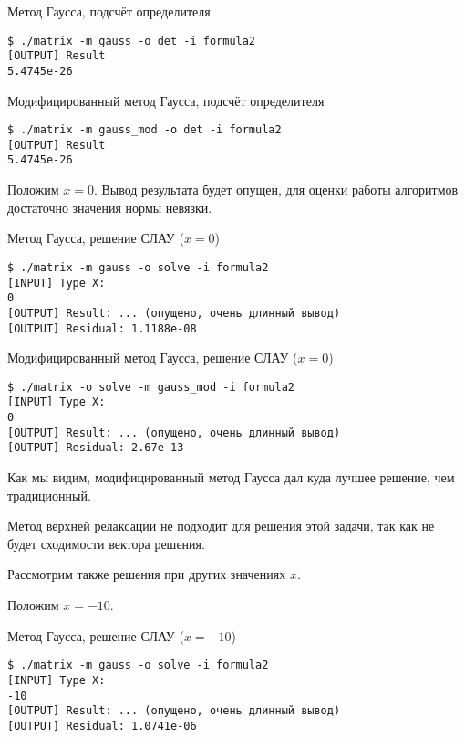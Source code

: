 \documentclass[a4paper,11pt]{report}
\begin{document}
\begin{bash}
 \caption{Метод Гаусса, подсчёт определителя}
 \begin{verbatim}
$ ./matrix -m gauss -o det -i formula2 
[OUTPUT] Result
5.4745e-26
 \end{verbatim}
\end{bash}


\begin{bash}
 \caption{Модифицированный метод Гаусса, подсчёт определителя}
 \begin{verbatim}
$ ./matrix -m gauss_mod -o det -i formula2 
[OUTPUT] Result
5.4745e-26
 \end{verbatim}
\end{bash}

Положим $x = 0$. Вывод результата будет опущен, для оценки работы алгоритмов достаточно значения нормы невязки.

\begin{bash}
\caption{Метод Гаусса, решение СЛАУ ($x = 0$)}
\begin{verbatim}
$ ./matrix -m gauss -o solve -i formula2 
[INPUT] Type X:
0
[OUTPUT] Result: ... (опущено, очень длинный вывод)
[OUTPUT] Residual: 1.1188e-08
\end{verbatim}
\end{bash}


\begin{bash}
\caption{Модифицированный метод Гаусса, решение СЛАУ ($x = 0$)}
\begin{verbatim}
$ ./matrix -o solve -m gauss_mod -i formula2
[INPUT] Type X:
0
[OUTPUT] Result: ... (опущено, очень длинный вывод)
[OUTPUT] Residual: 2.67e-13
\end{verbatim}
\end{bash}

Как мы видим, модифицированный метод Гаусса дал куда лучшее решение, чем традиционный.

Метод верхней релаксации не подходит для решения этой задачи, так как не будет сходимости вектора решения.

Рассмотрим также решения при других значениях $x$.

Положим $x = -10$.

\begin{bash}
\caption{Метод Гаусса, решение СЛАУ ($x = -10$)}
\begin{verbatim}
$ ./matrix -m gauss -o solve -i formula2 
[INPUT] Type X:
-10
[OUTPUT] Result: ... (опущено, очень длинный вывод)
[OUTPUT] Residual: 1.0741e-06
\end{verbatim}
\end{bash}
\end{document}
